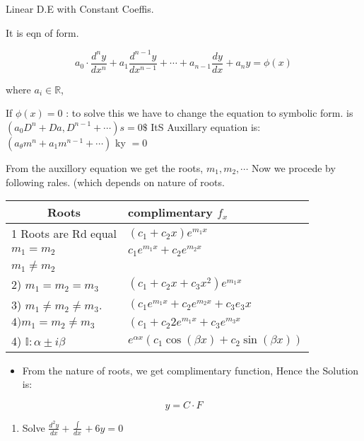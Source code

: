 \documentclass[12pt, a4paper]{article}
\begin{document}
Linear D.E with Constant Coeffis.

It is eqn of form.

$$
a_{0} \cdot \frac{d^{n} y}{d x^{n}}+a_{1} \frac{d^{n-1} y}{d x^{n-1}}+\cdots+a_{n-1} \frac{d y}{d x}+a_{n} y=\phi(x)
$$

where $a_{i} \in \mathbb{R}$,

If $\phi(x)=0$ : to solve this we have to change the equation to symbolic form. is $\left(a_{0} D^{n}+D a, D^{n-1}+\cdots\right) s=0 \$$ ItS Auxillary equation is: $\left(a_{\theta} m^{n}+a_{1} m^{n-1}+\cdots\right)$ ky $=0$

From the auxillory equation we get the roots, $m_{1}, m_{2}, \cdots$ Now we procede by following rales. (which depends on nature of roots.

\begin{center}
\begin{tabular}{|l|l|}
\hline
\multicolumn{1}{|c|}{Roots} & complimentary $f_{x}$ \\
\hline
1 Roots are Rd equal & $\left(c_{1}+c_{2} x\right) e^{m_{1} x}$ \\
$m_{1}=m_{2}$ & $c_{1} e^{m_{1} x}+c_{2} e^{m_{2} x}$ \\
$m_{1} \neq m_{2}$ &  \\
2) $m_{1}=m_{2}=m_{3}$ & $\left(c_{1}+c_{2} x+c_{3} x^{2}\right) e^{m_{1} x}$ \\
3) $m_{1} \neq m_{2} \neq m_{3}$. & $\left(c_{1} e^{m_{1} x}+c_{2} e^{m_{2} x}+c_{3} e_{3} x\right.$ \\
$4) m_{1}=m_{2} \neq m_{3}$ & $\left(c_{1}+c_{2} 2 e^{m_{1} x}+c_{3} e^{m_{3} x}\right.$ \\
4) $\mathbb{I}: \alpha \pm i \beta$ & $e^{\alpha x}\left(c_{1} \cos (\beta x)+c_{2} \sin (\beta x)\right)$ \\
\hline
\end{tabular}
\end{center}

\begin{itemize}
  \item From the nature of roots, we get complimentary function, Hence the Solution is:
\end{itemize}

$$
y=C \cdot F
$$

\begin{enumerate}
  \item Solve $\frac{d^{2} y}{d x}+\frac{\int}{d x}+6 y=0$
\end{enumerate}
\end{document}
